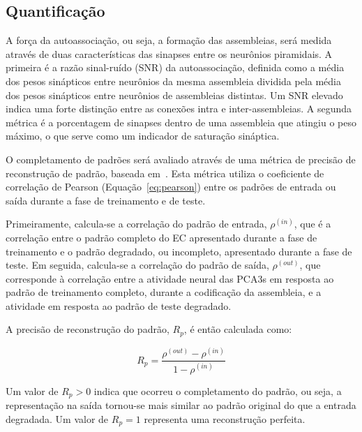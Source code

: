 \subsection{Quantificação}\label{sec:quantificacao}

A força da autoassociação, ou seja, a formação das assembleias, será medida através de duas características das sinapses entre os
neurônios piramidais. A primeira é a razão sinal-ruído (SNR) da autoassociação, definida como a média dos pesos sinápticos entre
neurônios da mesma assembleia dividida pela média dos pesos sinápticos entre neurônios de assembleias distintas. Um SNR elevado
indica uma forte distinção entre as conexões intra e inter-assembleias. A segunda métrica é a porcentagem de sinapses dentro de
uma assembleia que atingiu o peso máximo, o que serve como um indicador de saturação sináptica.

O completamento de padrões será avaliado através de uma métrica de precisão de reconstrução de padrão, baseada
em~\cite{kopsickFormation2024}. Esta métrica utiliza o coeficiente de correlação de Pearson (Equação~\ref{eq:pearson}) entre os
padrões de entrada ou saída durante a fase de treinamento e de teste. 

Primeiramente, calcula-se a correlação do padrão de entrada, $\rho^{(in)}$, que é a correlação entre o padrão completo do EC
apresentado durante a fase de treinamento e o padrão degradado, ou incompleto, apresentado durante a fase de teste. Em seguida,
calcula-se a correlação do padrão de saída, $\rho^{(out)}$, que corresponde à correlação entre a atividade neural das PCA3s em
resposta ao padrão de treinamento completo, durante a codificação da assembleia, e a atividade em resposta ao padrão de teste
degradado.

A precisão de reconstrução do padrão, $R_p$, é então calculada como:

\begin{equation}
    \label{eq:rp}
    R_p = \frac{\rho^{(out)} - \rho^{(in)}}{1 - \rho^{(in)}}
\end{equation}

Um valor de $R_p > 0$ indica que ocorreu o completamento do padrão, ou seja, a representação na saída tornou-se mais similar ao
padrão original do que a entrada degradada. Um valor de $R_p = 1$ representa uma reconstrução perfeita.
